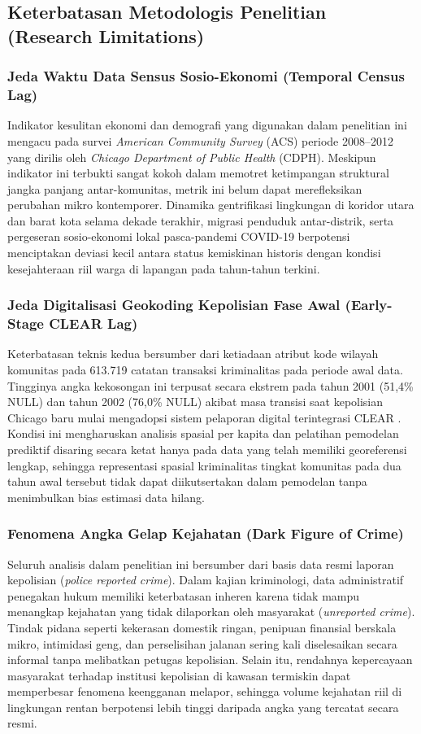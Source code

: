 \documentclass[11pt,a4paper]{article}
\begin{document}
\subsection{Keterbatasan Metodologis Penelitian (Research Limitations)}

\subsubsection{Jeda Waktu Data Sensus Sosio-Ekonomi (Temporal Census Lag)}
Indikator kesulitan ekonomi dan demografi yang digunakan dalam penelitian ini mengacu pada survei \textit{American Community Survey} (ACS) periode 2008--2012 yang dirilis oleh \textit{Chicago Department of Public Health} (CDPH). Meskipun indikator ini terbukti sangat kokoh dalam memotret ketimpangan struktural jangka panjang antar-komunitas, metrik ini belum dapat merefleksikan perubahan mikro kontemporer. Dinamika gentrifikasi lingkungan di koridor utara dan barat kota selama dekade terakhir, migrasi penduduk antar-distrik, serta pergeseran sosio-ekonomi lokal pasca-pandemi COVID-19 berpotensi menciptakan deviasi kecil antara status kemiskinan historis dengan kondisi kesejahteraan riil warga di lapangan pada tahun-tahun terkini.

\subsubsection{Jeda Digitalisasi Geokoding Kepolisian Fase Awal (Early-Stage CLEAR Lag)}
Keterbatasan teknis kedua bersumber dari ketiadaan atribut kode wilayah komunitas pada 613.719 catatan transaksi kriminalitas pada periode awal data. Tingginya angka kekosongan ini terpusat secara ekstrem pada tahun 2001 (51,4\% NULL) dan tahun 2002 (76,0\% NULL) akibat masa transisi saat kepolisian Chicago baru mulai mengadopsi sistem pelaporan digital terintegrasi CLEAR \cite{skogan2016}. Kondisi ini mengharuskan analisis spasial per kapita dan pelatihan pemodelan prediktif disaring secara ketat hanya pada data yang telah memiliki georeferensi lengkap, sehingga representasi spasial kriminalitas tingkat komunitas pada dua tahun awal tersebut tidak dapat diikutsertakan dalam pemodelan tanpa menimbulkan bias estimasi data hilang.

\subsubsection{Fenomena Angka Gelap Kejahatan (Dark Figure of Crime)}
Seluruh analisis dalam penelitian ini bersumber dari basis data resmi laporan kepolisian (\textit{police reported crime}). Dalam kajian kriminologi, data administratif penegakan hukum memiliki keterbatasan inheren karena tidak mampu menangkap kejahatan yang tidak dilaporkan oleh masyarakat (\textit{unreported crime}). Tindak pidana seperti kekerasan domestik ringan, penipuan finansial berskala mikro, intimidasi geng, dan perselisihan jalanan sering kali diselesaikan secara informal tanpa melibatkan petugas kepolisian. Selain itu, rendahnya kepercayaan masyarakat terhadap institusi kepolisian di kawasan termiskin dapat memperbesar fenomena keengganan melapor, sehingga volume kejahatan riil di lingkungan rentan berpotensi lebih tinggi daripada angka yang tercatat secara resmi.
\end{document}
